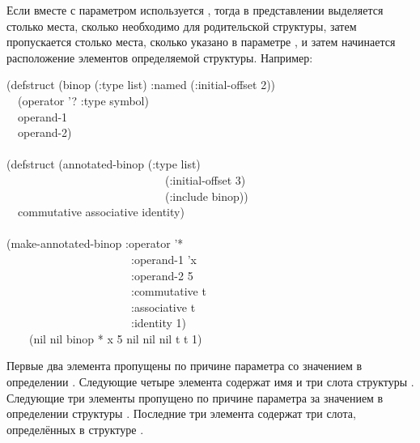 Если вместе с параметром  используется , тогда в
представлении выделяется столько места, сколько необходимо для родительской
структуры, затем пропускается столько места, сколько указано в параметре
, и затем начинается расположение элементов определяемой
структуры.  Например:
\begin{lisp}
(defstruct (binop (:type list) :named (:initial-offset 2)) \\
~~(operator '? :type symbol) \\
~~operand-1 \\
~~operand-2) \\
 \\
(defstruct (annotated-binop (:type list) \\
~~~~~~~~~~~~~~~~~~~~~~~~~~~~(:initial-offset 3) \\
~~~~~~~~~~~~~~~~~~~~~~~~~~~~(:include binop)) \\
~~commutative associative identity) \\
 \\
(make-annotated-binop :operator '* \\
~~~~~~~~~~~~~~~~~~~~~~:operand-1 'x \\
~~~~~~~~~~~~~~~~~~~~~~:operand-2 5 \\
~~~~~~~~~~~~~~~~~~~~~~:commutative t \\
~~~~~~~~~~~~~~~~~~~~~~:associative t \\
~~~~~~~~~~~~~~~~~~~~~~:identity 1) \\
~~~\EV\ (nil nil binop * x 5 nil nil nil t t 1)
\end{lisp}
Первые два {\nil} элемента пропущены по причине параметра 
со значением  в определении . Следующие четыре элемента
содержат имя и три слота структуры . Следующие три {\nil} элементы
пропущено по причине параметра  за значением  в
определении структуры . Последние три элемента содержат три
слота, определённых в структуре .

\fi